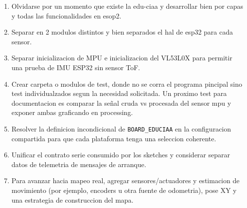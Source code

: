 \documentclass[11pt,a4paper]{article}
\begin{document}
\begin{enumerate}
    \item Olvidarse por un momento que existe la edu-ciaa y desarrollar bien por capas y todas las funcionalidades en esop2.
    \item Separar en 2 modulos distintos y bien separados el hal de esp32 para cada sensor.
  \item Separar inicializacion de MPU e inicializacion del VL53L0X para permitir una prueba de IMU ESP32 sin sensor ToF.
  \item Crear carpeta o modulos de test, donde no se corra el programa pincipal sino test individualzados segun la necesidad solicitada. Un proximo test para documentacion es comparar la señal cruda vs procesada del sensor mpu y exponer ambas graficando en processing.
  \item Resolver la definicion incondicional de \texttt{BOARD\_EDUCIAA} en la configuracion compartida para que cada plataforma tenga una seleccion coherente.
  \item Unificar el contrato serie consumido por los sketches y considerar separar datos de telemetria de mensajes de arranque.
  \item Para avanzar hacia mapeo real, agregar sensores/actuadores y estimacion de movimiento (por ejemplo, encoders u otra fuente de odometria), pose XY y una estrategia de construccion del mapa.
\end{enumerate}
\end{document}
